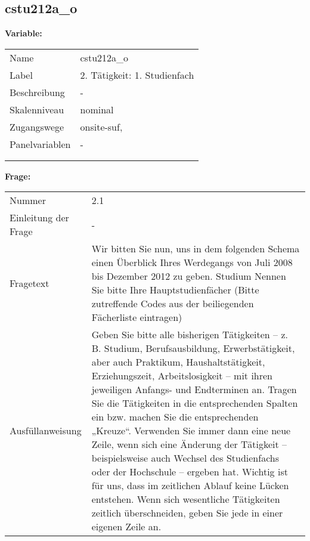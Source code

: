 	
	
	\subsection{cstu212a\_o}
	\label{subSection:cstu212a_o}

	\noindent\textbf{Variable:}\\
		\begin{tabular}{lL{11.3cm}}
			\label{tableVariable:cstu212a_o}
			Name & cstu212a\_o \\
			Label & 2. Tätigkeit: 1. Studienfach \\
			Beschreibung & - \\
			Skalenniveau & nominal \\
			Zugangswege &
				onsite-suf,
 \\
			Panelvariablen & -
			 \\
			 \\
 \\
		\end{tabular}

		\vspace*{1 cm}
		\noindent\textbf{Frage:}\\
		\begin{tabular}{lL{11.3cm}}
			\label{tableQuestion:cstu212a_o}
			Nummer & 2.1 \\
			Einleitung der Frage & - \\
			Fragetext & Wir bitten Sie nun, uns in dem folgenden Schema einen Überblick Ihres Werdegangs von Juli 2008 bis Dezember 2012 zu geben.
Studium
Nennen Sie bitte Ihre Hauptstudienfächer
(Bitte zutreffende Codes aus der beiliegenden Fächerliste eintragen) \\
			Ausfüllanweisung & Geben Sie bitte alle bisherigen Tätigkeiten – z. B. Studium, Berufsausbildung, Erwerbstätigkeit, aber auch Praktikum, Haushaltstätigkeit,
Erziehungszeit, Arbeitslosigkeit – mit ihren jeweiligen Anfangs- und Endterminen an. Tragen Sie die Tätigkeiten in die entsprechenden Spalten ein bzw. machen Sie die entsprechenden „Kreuze“. Verwenden Sie immer dann eine neue Zeile, wenn sich eine Änderung der Tätigkeit – beispielsweise auch Wechsel des Studienfachs oder der Hochschule – ergeben hat. Wichtig ist für uns, dass im zeitlichen Ablauf keine Lücken entstehen. Wenn sich wesentliche Tätigkeiten zeitlich überschneiden, geben Sie jede in einer eigenen Zeile an. \\
		\end{tabular}





